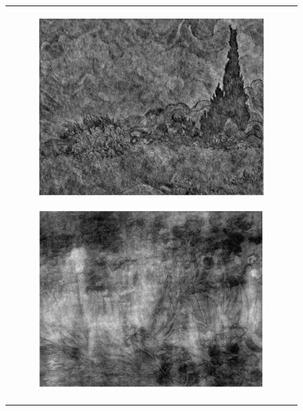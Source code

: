 \documentclass[hidelinks,12pt]{article}
\begin{document}
	\pagebreak
	
	\begin{figure}[!h]
		\centering
		\begin{tabular}{c}
			\begin{subfigure}[h]{0.45\textwidth}
				\centering
				\includegraphics[width=\textwidth]{figures/mag3_phase2.PNG}
			\end{subfigure}
			\hfill
			\begin{subfigure}[h]{0.45\textwidth}
				\centering
				\includegraphics[width=\textwidth]{figures/mag2_phase3.PNG}
			\end{subfigure} \\
			

\end{tabular}
\end{figure}
\end{document}
